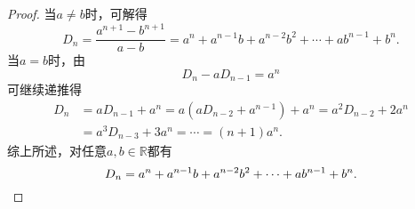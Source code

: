 \begin{example}
\begin{proof}
当\(a \neq b\)时，可解得\begin{equation*}
	D_n = \frac{a^{n+1} - b^{n+1}}{a - b}
	= a^n + a^{n-1} b + a^{n-2} b^2 + \dotsb + a b^{n-1} + b^n.
\end{equation*}
当\(a = b\)时，由\begin{equation*}
	D_n - a D_{n-1} = a^n
\end{equation*}可继续递推得\begin{align*}
	D_n &= a D_{n-1} + a^n
	= a(a D_{n-2} + a^{n-1}) + a^n
	= a^2 D_{n-2} + 2 a^n \\
	&= a^3 D_{n-3} + 3 a^n
	= \dotsb
	= (n+1) a^n.
\end{align*}
综上所述，对任意\(a,b\in\mathbb{R}\)都有\begin{equation*}
	D_n = a^n + a^{n-1} b + a^{n-2} b^2 + \dotsb + a b^{n-1} + b^n.
	\qedhere
\end{equation*}
\end{proof}
\end{example}


